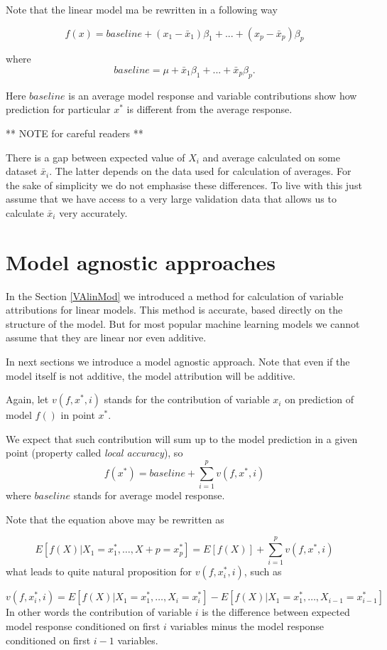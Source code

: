 \documentclass[]{book}
\theoremstyle{definition}
\theoremstyle{definition}
\theoremstyle{definition}
\theoremstyle{remark}
\begin{document}
Note that the linear model ma be rewritten in a following way

\[
f(x) = baseline + (x_1 - \bar x_1) \beta_1 + ... + (x_p - \bar x_p) \beta_p
\]

where \[
baseline = \mu + \bar x_1 \beta_1 + ... + \bar x_p \beta_p.
\]

Here \(baseline\) is an average model response and variable
contributions show how prediction for particular \(x^*\) is different
from the average response.

** NOTE for careful readers **

There is a gap between expected value of \(X_i\) and average calculated
on some dataset \(\bar x_i\). The latter depends on the data used for
calculation of averages. For the sake of simplicity we do not emphasise
these differences. To live with this just assume that we have access to
a very large validation data that allows us to calculate \(\bar x_i\)
very accurately.

\hypertarget{modelAgnosticAttribution}{%
\section{Model agnostic approaches}\label{modelAgnosticAttribution}}

In the Section \ref{VAlinMod} we introduced a method for calculation of
variable attributions for linear models. This method is accurate, based
directly on the structure of the model. But for most popular machine
learning models we cannot assume that they are linear nor even additive.

In next sections we introduce a model agnostic approach. Note that even
if the model itself is not additive, the model attribution will be
additive.

Again, let \(v(f, x^*, i)\) stands for the contribution of variable
\(x_i\) on prediction of model \(f()\) in point \(x^*\).

We expect that such contribution will sum up to the model prediction in
a given point (property called \emph{local accuracy}), so \[
f(x^*) = baseline + \sum_{i=1}^p v(f, x^*, i)
\] where \(baseline\) stands for average model response.

Note that the equation above may be rewritten as

\[
E [f(X)|X_1 = x_1^*, \ldots, X+p = x_p^*] = E[f(X)] + \sum_{i=1}^p v(f, x^*, i)
\] what leads to quite natural proposition for \(v(f, x^*_i, i)\), such
as

\[
v(f, x^*_i, i) = E [f(X) | X_1 = x_1^*, \ldots, X_i = x_i^*] - E [f(X) | X_1 = x_1^*, \ldots, X_{i-1} = x_{i-1}^*] 
\] In other words the contribution of variable \(i\) is the difference
between expected model response conditioned on first \(i\) variables
minus the model response conditioned on first \(i-1\) variables.
\end{document}
